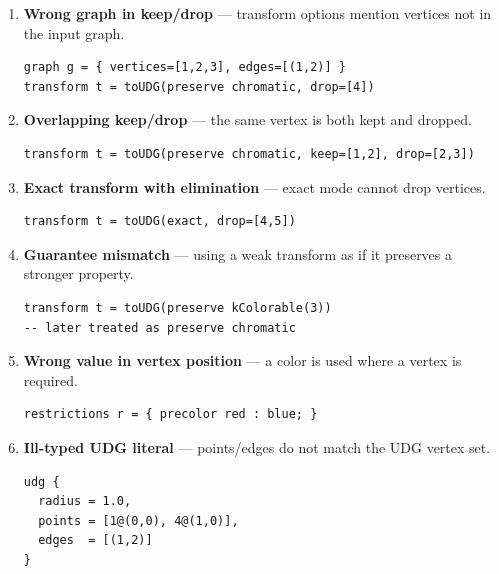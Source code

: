 \documentclass[11pt]{article}
\begin{document}
\begin{enumerate}
  \item \textbf{Wrong graph in keep/drop} --- transform options mention vertices not in the input graph.
\begin{lstlisting}[style=plain]
graph g = { vertices=[1,2,3], edges=[(1,2)] }
transform t = toUDG(preserve chromatic, drop=[4])
\end{lstlisting}

  \item \textbf{Overlapping keep/drop} --- the same vertex is both kept and dropped.
\begin{lstlisting}[style=plain]
transform t = toUDG(preserve chromatic, keep=[1,2], drop=[2,3])
\end{lstlisting}

  \item \textbf{Exact transform with elimination} --- exact mode cannot drop vertices.
\begin{lstlisting}[style=plain]
transform t = toUDG(exact, drop=[4,5])
\end{lstlisting}

  \item \textbf{Guarantee mismatch} --- using a weak transform as if it preserves a stronger property.
\begin{lstlisting}[style=plain]
transform t = toUDG(preserve kColorable(3))
-- later treated as preserve chromatic
\end{lstlisting}

  \item \textbf{Wrong value in vertex position} --- a color is used where a vertex is required.
\begin{lstlisting}[style=plain]
restrictions r = { precolor red : blue; }
\end{lstlisting}

  \item \textbf{Ill-typed UDG literal} --- points/edges do not match the UDG vertex set.
\begin{lstlisting}[style=plain]
udg {
  radius = 1.0,
  points = [1@(0,0), 4@(1,0)],
  edges  = [(1,2)]
}
\end{lstlisting}
\end{enumerate}
\end{document}
